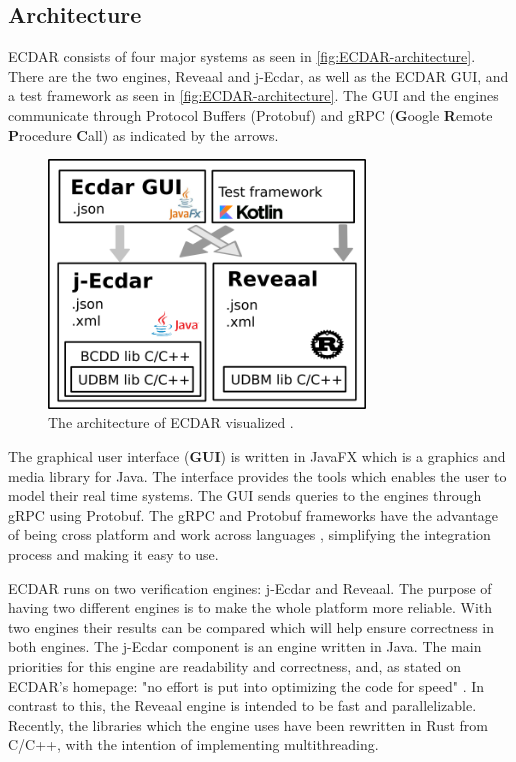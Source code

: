 \subsection{Architecture}\label{sub:architecture}
ECDAR consists of four major systems as seen in \autoref{fig:ECDAR-architecture}.
There are the two engines, Reveaal and j-Ecdar, as well as the ECDAR GUI, and a test framework as seen in \autoref{fig:ECDAR-architecture}. 
The GUI and the engines communicate through Protocol Buffers (Protobuf) and gRPC (\textbf{G}oogle \textbf{R}emote \textbf{P}rocedure \textbf{C}all) as indicated by the arrows.
\begin{figure}[H]
    \centering
    \includegraphics[width=0.75\textwidth]{common/figures/ArchOverview.png}
    \caption{The architecture of ECDAR visualized \cite{ECDARNET}.}
    \label{fig:ECDAR-architecture}
\end{figure}

The graphical user interface (\textbf{GUI}) is written in JavaFX \cite{ECDARNET}  which is a graphics and media library for Java. 
The interface provides the tools which enables the user to model their real time systems. The GUI sends queries to the engines through gRPC using Protobuf. 
The gRPC and Protobuf frameworks have the advantage of being cross platform and work across languages \cite{gRPC}\cite{google_protocol_nodate}, simplifying the integration process and making it easy to use.

ECDAR runs on two verification engines: j-Ecdar and Reveaal. 
The purpose of having two different engines is to make the whole platform more reliable. 
With two engines their results can be compared which will help ensure correctness in both engines.
The j-Ecdar component is an engine written in Java.
The main priorities for this engine are readability and correctness, and, as stated on ECDAR's homepage: "no effort is put into optimizing the code for speed" \cite{ECDARNET}.
In contrast to this, the Reveaal engine is intended to be fast and parallelizable. 
Recently, the libraries which the engine uses have been rewritten in Rust from C/C++, with the intention of implementing multithreading. 

